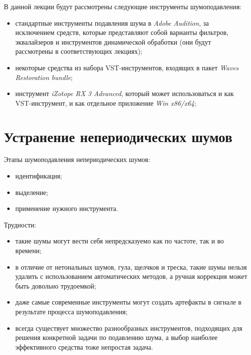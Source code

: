 \documentclass{beamer}
\begin{document}
\begin{frame}
  В данной лекции будут рассмотрены следующие инструменты шумоподавления:
  \begin{itemize}
    \item стандартные инструменты подавления шума в \emph{Adobe Audition}, за исключением средств, которые представляют собой варианты фильтров, эквалайзеров и инструментов динамической обработки (они будут рассмотрены в соответствующих лекциях);
    \item некоторые средства из набора VST-инструментов, входящих в пакет \emph{Waves Restoration bundle};
    \item инструмент \emph{iZotope RX 3 Advanced}, который может использоваться и как VST-инструмент, и как отдельное приложение \emph{Win x86/x64};
  \end{itemize}
\end{frame}

\section{Устранение непериодических шумов}
\begin{frame}
Этапы шумоподавления непериодических шумов:
\begin{itemize}
  \item идентификация;
  \item выделение;
  \item применение нужного инструмента.
\end{itemize}

Трудности:
\begin{itemize}
  \item такие шумы могут вести себя непредсказуемо как по частоте, так и во времени;
  \item в отличие от нетональных шумов, гула, щелчков и треска, такие шумы нельзя удалить с использованием автоматических методов, а ручная коррекция может быть довольно трудоемкой;
  \item даже самые современные инструменты могут создать артефакты в сигнале в результате процесса шумоподавления;
  \item всегда существует множество разнообразных инструментов, подходящих для решения конкретной задачи по подавлению шума, а выбор наиболее эффективного средства тоже непростая задача.
\end{itemize}
\end{frame}
\end{document}

